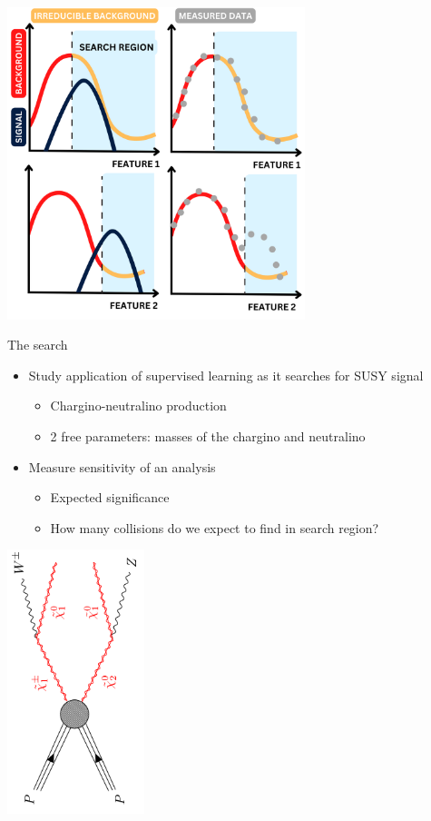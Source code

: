 \documentclass[UKenglish]{beamer}
\begin{document}
\begin{frame}
    \centering
    \includegraphics[width = 0.65\textwidth]{figures/DataComp.png}
\end{frame}
\begin{frame}{The search}
    \begin{itemize}
        \item Study application of supervised learning as it searches for SUSY signal 
        \begin{itemize}
            \item Chargino-neutralino production
            \item 2 free parameters: masses of the chargino and neutralino
        \end{itemize}
        \item Measure sensitivity of an analysis 
        \begin{itemize}
            \item Expected significance
            \item How many collisions do we expect to find in search region?
        \end{itemize} 
    \end{itemize}
    \centering
    \includegraphics[width=0.3\textwidth, angle = -90]{figures/WZSignal.png}
\end{frame}
\end{document}
